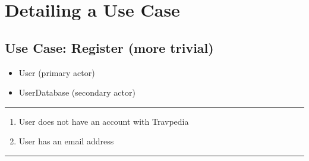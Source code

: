 \tablewidth

\hspace{-4.2cm}
\begin{minipage}[h][][s]{\linewidth}
	\section{Detailing a Use Case}
	\subsection{Use Case: Register \small{\textnormal{(more trivial)}}}
\end{minipage}

\begin{itemize}
	\item User (primary actor)
	\item UserDatabase (secondary actor)
\end{itemize}
\noindent\rule{\textwidth}{0.6pt}

\begin{enumerate}
	\item User does not have an account with Travpedia
	\item User has an email address
\end{enumerate}
\noindent\rule{\textwidth}{0.6pt}

